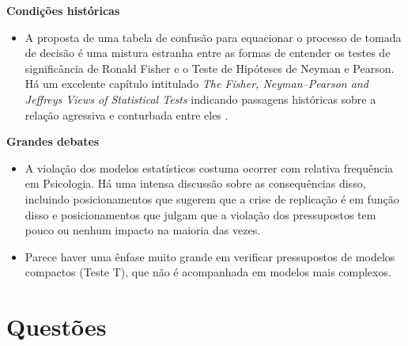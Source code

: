 \documentclass[
]{book}
\providecommand{\tightlist}{%
  \setlength{\itemsep}{0pt}\setlength{\parskip}{0pt}}
\begin{document}
\textbf{Condições históricas}

\begin{itemize}
\tightlist
\item
  A proposta de uma tabela de confusão para equacionar o processo de tomada de decisão é uma mistura estranha entre as formas de entender os testes de significância de Ronald Fisher e o Teste de Hipóteses de Neyman e Pearson. Há um excelente capítulo intitulado \emph{The Fisher, Neyman--Pearson and Jeffreys Views of Statistical Tests} indicando passagens históricas sobre a relação agressiva e conturbada entre eles \citep{Lecoutre2014}.
\end{itemize}

\textbf{Grandes debates}

\begin{itemize}
\item
  A violação dos modelos estatísticos costuma ocorrer com relativa frequência em Psicologia. Há uma intensa discussão sobre as consequências disso, incluindo posicionamentos que sugerem que a crise de replicação é em função disso e posicionamentos que julgam que a violação dos pressupostos tem pouco ou nenhum impacto na maioria das vezes.
\item
  Parece haver uma ênfase muito grande em verificar pressupostos de modelos compactos (Teste T), que não é acompanhada em modelos mais complexos.
\end{itemize}

\hypertarget{questuxf5es-2}{%
\section{Questões}\label{questuxf5es-2}}
\end{document}
